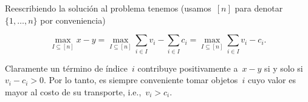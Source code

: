 
Reescribiendo la solución al problema tenemos (usamos~$[n]$ para
denotar~$\{1, \dots, n\}$ por conveniencia)

\begin{equation*}
  \max_{I \subseteq [n]} x - y = \max_{I \subseteq [n]} \sum_{i \in I} v_i - \sum_{i \in I} c_i = \max_{I \subseteq [n]} \sum_{i \in I} v_i - c_i.
\end{equation*}

Claramente un término de índice~$i$ contribuye positivamente a~$x - y$ si y solo
si~$v_i - c_i > 0$. Por lo tanto, es siempre conveniente tomar objetos~$i$ cuyo valor
es mayor al costo de su transporte, i.e.,~$v_i > c_i$.

